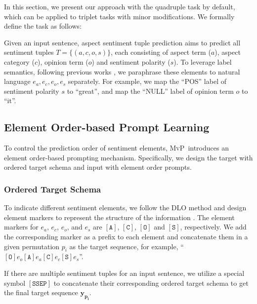 \documentclass[11pt]{article}
\newcommand\mvp{\textsc{MvP}}
\begin{document}
In this section, we present our approach with the quadruple task by default, which can be applied to triplet tasks with minor modifications. We formally define the task as follows:

Given an input sentence, aspect sentiment tuple prediction aims to predict all sentiment tuples $T=\{(a, c, o, 
s)\}$, each consisting of aspect term ($a$), aspect category ($c$), opinion term ($o$) and sentiment polarity ($s$).
To leverage label semantics, following previous works \cite{zhang-etal-2021-aspect}, we paraphrase these elements to natural language ${e_a, e_c, e_o, e_s}$ separately. For example, we map the ``POS'' label of sentiment polarity $s$ to ``great'', and map the ``NULL'' label of opinion term $o$ to ``it''.








\subsection{Element Order-based Prompt Learning}
\label{subsec:method:order-prompt-learning}

To control the prediction order of sentiment elements, \mvp~introduces an element order-based prompting mechanism. Specifically, we design the target with ordered target schema and input with element order prompts.

\subsubsection{Ordered Target Schema}
\label{subsubsec:method:target-schema}
To indicate different sentiment elements, we follow the DLO method \cite{hu-etal-2022-improving-aspect} and design element markers to represent the structure of the information \cite{DBLP:conf/iclr/PaoliniAKMAASXS21}. The element markers for $e_a$, $e_c$, $e_o$, and $e_s$ are $\mathtt{[A]}$, $\mathtt{[C]}$, $\mathtt{[O]}$ and $\mathtt{[S]}$, respectively.
We add the corresponding marker as a prefix to each element and concatenate them in a given permutation $p_i$ as the target sequence,
for example, ``$[\mathtt{O}] e_{o}[\mathtt{A}] e_{a}[\mathtt{C}] e_{c}[\mathtt{S}] e_{s}$''.


If there are multiple sentiment tuples for an input sentence, we utilize a special symbol $\mathtt{[SSEP]}$ to concatenate their corresponding ordered target schema to get the final target sequence $\boldsymbol{y_{p_i}}$.
\end{document}
